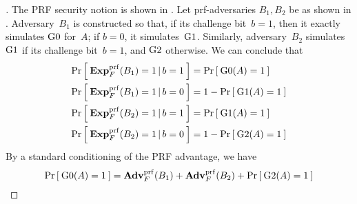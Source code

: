 \begin{proof}[]
The PRF security notion is shown in . Let
prf-adversaries $B_1, B_2$ be as shown in .
Adversary~$B_1$ is constructed so that, if its challenge bit~$b=1$,
then it exactly simulates $\text{G0}$ for~$A$; if $b=0$, it
simulates~$\text{G1}$.  Similarly, adversary~$B_2$ simulates~$\text{G1}$
if its challenge bit~$b=1$, and $\text{G2}$ otherwise.  We can conclude
that 
\begin{align*}
\Prob{\ExpPRF{F}{B_1} = 1\,|\,b=1} &= \Prob{\game{0}(A)=1} \\%
\Prob{\ExpPRF{F}{B_1} = 1\,|\,b=0} &= 1-\Prob{\game{1}(A)=1} \\%
\Prob{\ExpPRF{F}{B_2} = 1\,|\,b=1} &= \Prob{\game{1}(A)=1} \\%
\Prob{\ExpPRF{F}{B_2} = 1\,|\,b=0} &= 1-\Prob{\game{2}(A)=1} \\%
\end{align*}
%
\noindent
By a standard conditioning of the PRF advantage, we have 
\begin{equation*}
\Prob{\game{0}(A)=1} = \AdvPRF{F}{B_1} +\AdvPRF{F}{B_2} + \Prob{\game{2}(A)=1}%
\end{equation*}



\end{proof}
